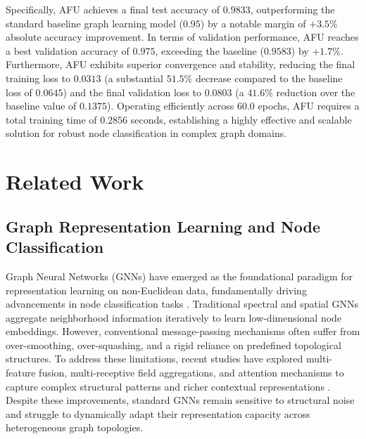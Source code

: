 \documentclass[10pt,twocolumn]{article}
\begin{document}
Specifically, \textsc{AFU} achieves a final test accuracy of $0.9833$, outperforming the standard baseline graph learning model ($0.95$) by a notable margin of $+3.5\%$ absolute accuracy improvement. In terms of validation performance, \textsc{AFU} reaches a best validation accuracy of $0.975$, exceeding the baseline ($0.9583$) by $+1.7\%$. Furthermore, \textsc{AFU} exhibits superior convergence and stability, reducing the final training loss to $0.0313$ (a substantial $51.5\%$ decrease compared to the baseline loss of $0.0645$) and the final validation loss to $0.0803$ (a $41.6\%$ reduction over the baseline value of $0.1375$). Operating efficiently across $60.0$ epochs, \textsc{AFU} requires a total training time of $0.2856$ seconds, establishing a highly effective and scalable solution for robust node classification in complex graph domains.

\section{Related Work}
\subsection{Graph Representation Learning and Node Classification}
Graph Neural Networks (GNNs) have emerged as the foundational paradigm for representation learning on non-Euclidean data, fundamentally driving advancements in node classification tasks \cite{target_ref, ref_4}. Traditional spectral and spatial GNNs aggregate neighborhood information iteratively to learn low-dimensional node embeddings. However, conventional message-passing mechanisms often suffer from over-smoothing, over-squashing, and a rigid reliance on predefined topological structures. To address these limitations, recent studies have explored multi-feature fusion, multi-receptive field aggregations, and attention mechanisms to capture complex structural patterns and richer contextual representations \cite{ref_2, ref_3}. Despite these improvements, standard GNNs remain sensitive to structural noise and struggle to dynamically adapt their representation capacity across heterogeneous graph topologies. 
\end{document}
